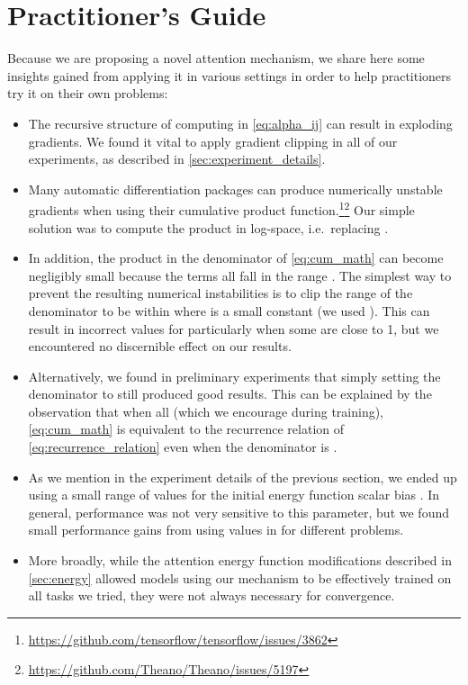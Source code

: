 \documentclass{article}
\begin{document}
\section{Practitioner's Guide}
\label{sec:practitioners}

Because we are proposing a novel attention mechanism, we share here some insights gained from applying it in various settings in order to help practitioners try it on their own problems:
\begin{itemize}[leftmargin=*,topsep=0pt,itemsep=-1ex,partopsep=2ex,parsep=2ex]
\item The recursive structure of computing  in \cref{eq:alpha_ij} can result in exploding gradients.
We found it vital to apply gradient clipping in all of our experiments, as described in \cref{sec:experiment_details}.
\item Many automatic differentiation packages can produce numerically unstable gradients when using their cumulative product function.\footnote{\url{https://github.com/tensorflow/tensorflow/issues/3862}}\footnote{\url{https://github.com/Theano/Theano/issues/5197}}
Our simple solution was to compute the product in log-space, i.e.\ replacing .
\item In addition, the product in the denominator of \cref{eq:cum_math} can become negligibly small because the terms  all fall in the range .
The simplest way to prevent the resulting numerical instabilities is to clip the range of the denominator to be within  where  is a small constant (we used ).
This can result in incorrect values for  particularly when some  are close to 1, but we encountered no discernible effect on our results.
\item Alternatively, we found in preliminary experiments that simply setting the denominator to  still produced good results.
This can be explained by the observation that when all  (which we encourage during training), \cref{eq:cum_math} is equivalent to the recurrence relation of \cref{eq:recurrence_relation} even when the denominator is .
\item As we mention in the experiment details of the previous section, we ended up using a small range of values for the initial energy function scalar bias .
In general, performance was not very sensitive to this parameter, but we found small performance gains from using values in  for different problems.
\item More broadly, while the attention energy function modifications described in \cref{sec:energy} allowed models using our mechanism to be effectively trained on all tasks we tried, they were not always necessary for convergence.

\end{itemize}
\end{document}
